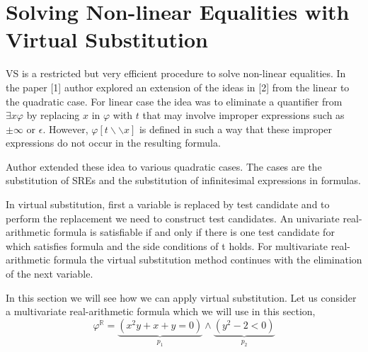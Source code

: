 \section{Solving Non-linear Equalities with Virtual Substitution}
\label{sec:solving non-linear equalities with virtual substitution}
VS is a restricted but very efficient procedure to solve non-linear equalities. In the paper [1] author explored an extension of the ideas in [2] from the linear to the quadratic case. For linear case the idea was to eliminate a quantifier from $\exists x \varphi$ by replacing $x$ in $\varphi$ with $t$ that may involve improper expressions such as $\pm \infty$ or $\epsilon$. However, $\varphi [t\backslash\backslash x]$ is defined in such a way that these improper expressions do not occur in the resulting formula.

Author extended these idea to various quadratic cases. The cases are the substitution of SREs and the substitution of infinitesimal expressions in formulas.

In virtual substitution, first a variable is replaced by test candidate and to perform the replacement we need to construct test candidates. An univariate real-arithmetic formula is satisfiable if and only if there is one test candidate for which satisfies formula and the side conditions of t holds. For multivariate real-arithmetic formula the virtual substitution method continues with the elimination of the next variable.

In this section we will see how we can apply virtual substitution. Let us consider a multivariate real-arithmetic formula which we will use in this section,
$$ \varphi^\mathbb{R} = \underbrace{(x^{2}y + x + y = 0)}\limits_{p_{1}} \wedge \underbrace{(y^{2} -2 < 0)}\limits_{p_{2}}$$
